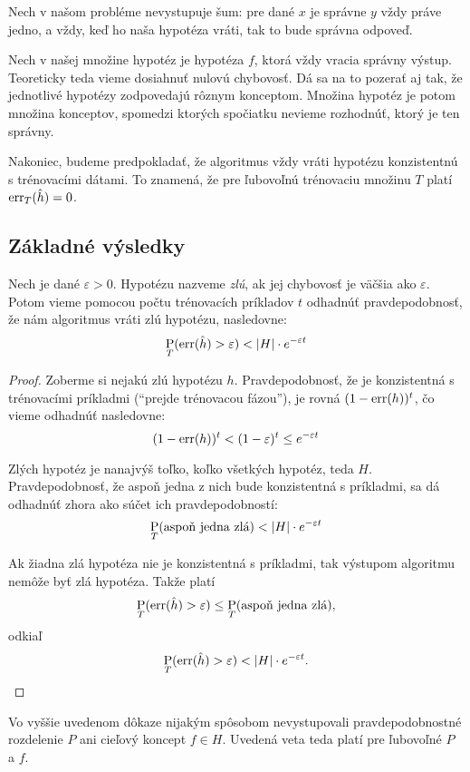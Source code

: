 Nech v našom probléme nevystupuje šum: pre dané $x$ je správne $y$ vždy
práve jedno, a vždy, keď ho naša hypotéza vráti, tak to bude správna
odpoveď.

Nech v našej množine hypotéz je hypotéza $f$, ktorá vždy vracia správny
výstup. Teoreticky teda vieme dosiahnuť nulovú chybovosť. Dá sa na to
pozerať aj tak, že jednotlivé hypotézy zodpovedajú rôznym konceptom.
Množina hypotéz je potom množina konceptov, spomedzi ktorých spočiatku
nevieme rozhodnúť, ktorý je ten správny.

Nakoniec, budeme predpokladať, že algoritmus vždy vráti hypotézu
konzistentnú s trénovacími dátami. To znamená, že pre ľubovoľnú
trénovaciu množinu $T$ platí $\mathrm{err}_T(\hat{h}) = 0$.



\subsection{Základné výsledky}

\begin{theorem} \label{thm:badhypobound}
  Nech je dané $\varepsilon > 0$. Hypotézu nazveme \emph{zlú}, ak jej
  chybovosť je väčšia ako $\varepsilon$. Potom vieme pomocou počtu
  trénovacích príkladov $t$ odhadnúť pravdepodobnosť, že nám algoritmus
  vráti zlú hypotézu, nasledovne:
  $$\operatorname*{\mathrm{P}}_T(\mathrm{err}(\hat{h}) > \varepsilon) < |H| \cdot e^{-\varepsilon t}$$
\end{theorem}
\begin{proof}
  Zoberme si nejakú zlú hypotézu $h$. Pravdepodobnosť, že je
  konzistentná s trénovacími príkladmi (``prejde trénovacou fázou''),
  je rovná $(1 - \mathrm{err}(h))^t$, čo vieme odhadnúť nasledovne:
  $$(1 - \mathrm{err}(h))^t < (1 - \varepsilon)^t \leq e^{-\varepsilon t}$$
  
  Zlých hypotéz je nanajvýš toľko, koľko všetkých hypotéz, teda
  $H$. Pravdepodobnosť, že aspoň jedna z nich bude konzistentná s
  príkladmi, sa dá odhadnúť zhora ako súčet ich pravdepodobností:
  $$\operatorname*{\mathrm{P}}_T(\text{aspoň jedna zlá}) < |H| \cdot e^{-\varepsilon t}$$
  
  Ak žiadna zlá hypotéza nie je konzistentná s príkladmi, tak výstupom
  algoritmu nemôže byť zlá hypotéza. Takže platí
  $$\operatorname*{\mathrm{P}}_T(\mathrm{err}(\hat{h}) > \varepsilon) \leq \operatorname*{\mathrm{P}}_T(\text{aspoň jedna zlá}),$$
  odkiaľ
  $$\operatorname*{\mathrm{P}}_T(\mathrm{err}(\hat{h}) > \varepsilon) < |H| \cdot e^{-\varepsilon t}.$$
\end{proof}
\begin{remark}
  Vo vyššie uvedenom dôkaze nijakým spôsobom nevystupovali
  pravdepodobnostné rozdelenie $P$ ani cieľový koncept $f \in H$.
  Uvedená veta teda platí pre ľubovoľné $P$ a $f$.
\end{remark}

